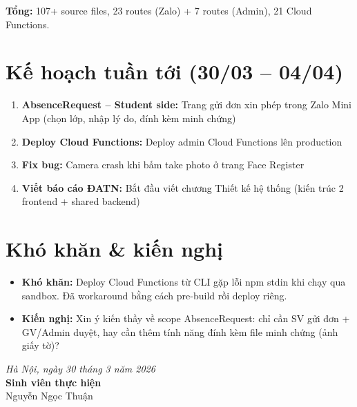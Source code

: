 \documentclass{article}
\begin{document}
\textbf{Tổng:} 107+ source files, 23 routes (Zalo) + 7 routes (Admin), 21 Cloud Functions.

\section{Kế hoạch tuần tới (30/03 -- 04/04)}

\begin{enumerate}[leftmargin=1.5em]
  \item \textbf{AbsenceRequest -- Student side:} Trang gửi đơn xin phép trong Zalo Mini App (chọn lớp, nhập lý do, đính kèm minh chứng)
  \item \textbf{Deploy Cloud Functions:} Deploy admin Cloud Functions lên production
  \item \textbf{Fix bug:} Camera crash khi bấm take photo ở trang Face Register
  \item \textbf{Viết báo cáo ĐATN:} Bắt đầu viết chương Thiết kế hệ thống (kiến trúc 2 frontend + shared backend)
\end{enumerate}

\section{Khó khăn \& kiến nghị}

\begin{itemize}[leftmargin=1.5em]
  \item \textbf{Khó khăn:} Deploy Cloud Functions từ CLI gặp lỗi npm stdin khi chạy qua sandbox. Đã workaround bằng cách pre-build rồi deploy riêng.
  \item \textbf{Kiến nghị:} Xin ý kiến thầy về scope AbsenceRequest: chỉ cần SV gửi đơn + GV/Admin duyệt, hay cần thêm tính năng đính kèm file minh chứng (ảnh giấy tờ)?
\end{itemize}

\vspace{1.5em}
\begin{flushright}
\textit{Hà Nội, ngày 30 tháng 3 năm 2026}\\[1em]
\textbf{Sinh viên thực hiện}\\[2em]
Nguyễn Ngọc Thuận
\end{flushright}
\end{document}

